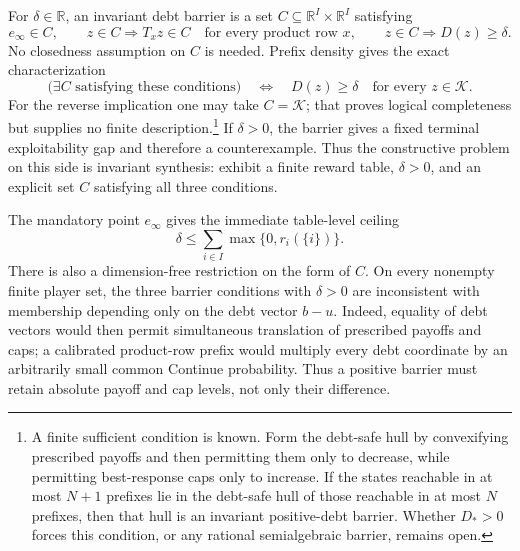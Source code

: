 \documentclass[11pt]{article}
\newcommand{\R}{\mathbb R}
\newcommand{\K}{\mathcal K}
\begin{document}
For $\delta\in\R$, an invariant debt barrier is a set
$C\subseteq\R^I\times\R^I$ satisfying
\[
 e_\infty\in C,
 \qquad
 z\in C\Longrightarrow T_xz\in C
       \quad\text{for every product row }x,
 \qquad
 z\in C\Longrightarrow D(z)\ge\delta.
\]
No closedness assumption on $C$ is needed.  Prefix density gives the exact
characterization
\[
 \bigl(\exists C\text{ satisfying these conditions}\bigr)
 \quad\Longleftrightarrow\quad
 D(z)\ge\delta\quad\text{for every }z\in\K.
\]
For the reverse implication one may take $C=\K$; that proves logical
completeness but supplies no finite description.\footnote{A finite sufficient
condition is known.  Form the debt-safe hull by convexifying prescribed
payoffs and then permitting them only to decrease, while permitting
best-response caps only to increase.  If the states reachable in at most
$N+1$ prefixes lie in the debt-safe hull of those reachable in at most $N$
prefixes, then that hull is an invariant positive-debt barrier.  Whether
$D_*>0$ forces this condition, or any rational semialgebraic barrier, remains
open.}  If $\delta>0$, the barrier
gives a fixed terminal exploitability gap and therefore a counterexample.
Thus the constructive problem on this side is invariant synthesis: exhibit a
finite reward table, $\delta>0$, and an explicit set $C$ satisfying all three
conditions.

The mandatory point $e_\infty$ gives the immediate table-level ceiling
\[
 \boxed{\delta\le
   \sum_{i\in I}\max\{0,r_i(\{i\})\}.}
\]
There is also a dimension-free restriction on the form of $C$.  On every
nonempty finite player set, the three barrier conditions with $\delta>0$ are
inconsistent with membership depending only on the debt vector $b-u$.
Indeed, equality of debt vectors would then permit simultaneous translation
of prescribed payoffs and caps; a calibrated product-row prefix
would multiply every debt coordinate by an arbitrarily small common
Continue probability.  Thus a positive barrier must retain absolute payoff
and cap levels, not only their difference.
\end{document}
